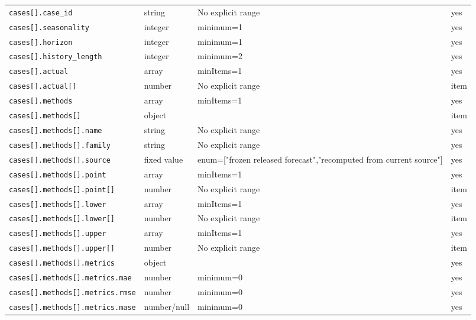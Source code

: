 \begin{longtable}{@{}p{}p{}p{}p{}@{}}
\texttt{cases[].\allowbreak{}case\_\allowbreak{}id} & string & No explicit range & yes\\
\texttt{cases[].\allowbreak{}seasonality} & integer & minimum=1 & yes\\
\texttt{cases[].\allowbreak{}horizon} & integer & minimum=1 & yes\\
\texttt{cases[].\allowbreak{}history\_\allowbreak{}length} & integer & minimum=2 & yes\\
\texttt{cases[].\allowbreak{}actual} & array & minItems=1 & yes\\
\texttt{cases[].\allowbreak{}actual[]} & number & No explicit range & item\\
\texttt{cases[].\allowbreak{}methods} & array & minItems=1 & yes\\
\texttt{cases[].\allowbreak{}methods[]} & object &  & item\\
\texttt{cases[].\allowbreak{}methods[].\allowbreak{}name} & string & No explicit range & yes\\
\texttt{cases[].\allowbreak{}methods[].\allowbreak{}family} & string & No explicit range & yes\\
\texttt{cases[].\allowbreak{}methods[].\allowbreak{}source} & fixed value & enum=["frozen released forecast","recomputed from current source"] & yes\\
\texttt{cases[].\allowbreak{}methods[].\allowbreak{}point} & array & minItems=1 & yes\\
\texttt{cases[].\allowbreak{}methods[].\allowbreak{}point[]} & number & No explicit range & item\\
\texttt{cases[].\allowbreak{}methods[].\allowbreak{}lower} & array & minItems=1 & yes\\
\texttt{cases[].\allowbreak{}methods[].\allowbreak{}lower[]} & number & No explicit range & item\\
\texttt{cases[].\allowbreak{}methods[].\allowbreak{}upper} & array & minItems=1 & yes\\
\texttt{cases[].\allowbreak{}methods[].\allowbreak{}upper[]} & number & No explicit range & item\\
\texttt{cases[].\allowbreak{}methods[].\allowbreak{}metrics} & object &  & yes\\
\texttt{cases[].\allowbreak{}methods[].\allowbreak{}metrics.\allowbreak{}mae} & number & minimum=0 & yes\\
\texttt{cases[].\allowbreak{}methods[].\allowbreak{}metrics.\allowbreak{}rmse} & number & minimum=0 & yes\\
\texttt{cases[].\allowbreak{}methods[].\allowbreak{}metrics.\allowbreak{}mase} & number/null & minimum=0 & yes\\

\end{longtable}
